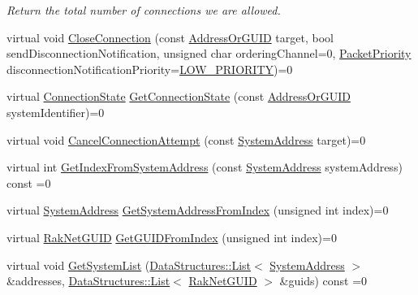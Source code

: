 \begin{DoxyCompactItemize}
\begin{DoxyCompactList}\small\item\em Return the total number of connections we are allowed. \end{DoxyCompactList}\item 
virtual void \hyperlink{class_rak_net_1_1_rak_peer_interface_afd637c6f44cb84ce5c151c700bb5cafe}{Close\-Connection} (const \hyperlink{struct_rak_net_1_1_address_or_g_u_i_d}{Address\-Or\-G\-U\-I\-D} target, bool send\-Disconnection\-Notification, unsigned char ordering\-Channel=0, \hyperlink{_packet_priority_8h_a659378374e516180f93640c79f59705c}{Packet\-Priority} disconnection\-Notification\-Priority=\hyperlink{_packet_priority_8h_a659378374e516180f93640c79f59705cadb8ee22a232a2787f32ba28da55c43c1}{L\-O\-W\-\_\-\-P\-R\-I\-O\-R\-I\-T\-Y})=0
\item 
virtual \hyperlink{namespace_rak_net_a84a0fb005391f71130dd341f77f62138}{Connection\-State} \hyperlink{class_rak_net_1_1_rak_peer_interface_a33744f90a202b8e57d6a825d6af080cc}{Get\-Connection\-State} (const \hyperlink{struct_rak_net_1_1_address_or_g_u_i_d}{Address\-Or\-G\-U\-I\-D} system\-Identifier)=0
\item 
virtual void \hyperlink{class_rak_net_1_1_rak_peer_interface_ad70d63c4093c1351f4a0c2949eac312a}{Cancel\-Connection\-Attempt} (const \hyperlink{struct_rak_net_1_1_system_address}{System\-Address} target)=0
\item 
virtual int \hyperlink{class_rak_net_1_1_rak_peer_interface_ab2015109d6bf787c46880fde513d4276}{Get\-Index\-From\-System\-Address} (const \hyperlink{struct_rak_net_1_1_system_address}{System\-Address} system\-Address) const =0
\item 
virtual \hyperlink{struct_rak_net_1_1_system_address}{System\-Address} \hyperlink{class_rak_net_1_1_rak_peer_interface_aaf66ca0e72313053922bfb1c1b602889}{Get\-System\-Address\-From\-Index} (unsigned int index)=0
\item 
virtual \hyperlink{struct_rak_net_1_1_rak_net_g_u_i_d}{Rak\-Net\-G\-U\-I\-D} \hyperlink{class_rak_net_1_1_rak_peer_interface_ac86fcbe5e750b08378703197bd9fddcf}{Get\-G\-U\-I\-D\-From\-Index} (unsigned int index)=0
\item 
virtual void \hyperlink{class_rak_net_1_1_rak_peer_interface_aa1939c66f7190e3c647a6a685a6eb248}{Get\-System\-List} (\hyperlink{class_data_structures_1_1_list}{Data\-Structures\-::\-List}$<$ \hyperlink{struct_rak_net_1_1_system_address}{System\-Address} $>$ \&addresses, \hyperlink{class_data_structures_1_1_list}{Data\-Structures\-::\-List}$<$ \hyperlink{struct_rak_net_1_1_rak_net_g_u_i_d}{Rak\-Net\-G\-U\-I\-D} $>$ \&guids) const =0

\end{DoxyCompactItemize}
